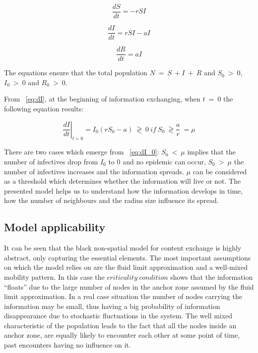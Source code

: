 \begin{equation}
\frac{dS}{dt} = -rSI \label{eq:dS}
\end{equation}

\begin{equation}
\frac{dI}{dt} = rSI - aI \label{eq:dI}
\end{equation}

\begin{equation}
\frac{dR}{dt} = aI \label{eq:dR}
\end{equation}

The equations ensure that the total population $N\ =\ S\ + I\ +\ R$ and $S_{0}\
>\ 0$, $I_{0}\ >\ 0$ and $R_{0}\ >\ 0$.

From ~\eqref{eq:dI}, at the beginning of information exchanging, when $t\ =\ 0$
the following equation results:

\begin{equation}
\left.
\frac{dI}{dt}
\right|_{t=0} = I_{0} (rS_{0} - a)\ \gtrless\ 0\ if\ S_{0}\ \gtrless
\frac{a}{r}\ = \mu
\label{eq:dI_0}
\end{equation}

There are two cases which emerge from ~\eqref{eq:dI_0}: $S_{0}\ <\ \mu$ implies
that the number of infectives drop from $I_{0}$ to 0 and no epidemic can occur,
$S_{0}\ >\ \mu$ the number of infectives increases and the information spreads.
$\mu$ can be considered as a threshold which determines whether the information
will live or not. The presented model helps us to understand how the information
develops in time, how the number of neighbours and the radius size influence its
spread.

\subsection{Model applicability}

It can be seen that the black non-spatial model for content exchange is highly
abstract, only capturing the essential elements. The most important assumptions
on which the model relies on are the fluid limit approximation and a well-mixed
mobility pattern. In this case the $criticality\ condition$ shows that the
information ``floats'' due to the large number of nodes in the anchor zone
assumed by the fluid limit approximation. In a real case situation the number of
nodes carrying the information may be small, thus having a big probability of
information disappearance due to stochastic fluctuations in the system. The well
mixed characteristic of the population leads to the fact that all the nodes
inside an anchor zone, are equally likely to encounter each other at some point
of time, past encounters having no influence on it.

